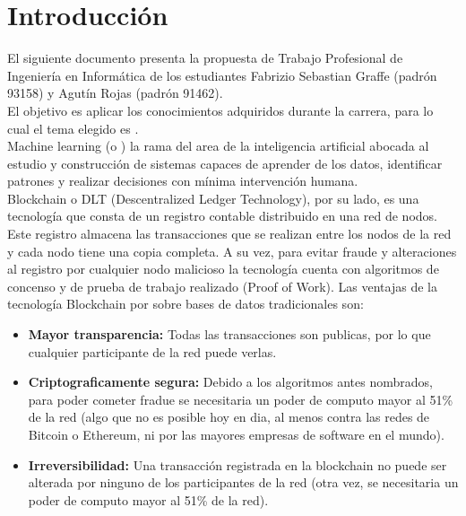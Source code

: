 \documentclass[
11pt, %
spanish, %
singlespacing, %
headsepline, %
]{MastersDoctoralThesis} %
\begin{document}

\tableofcontents %


\mainmatter %

\pagestyle{thesis} %

\chapter{Introducci\'on}
El siguiente documento presenta la propuesta de Trabajo Profesional de Ingeniería en Informática de los estudiantes Fabrizio Sebastian Graffe (padrón 93158) y Agutín Rojas (padrón 91462). \\

El objetivo es aplicar los conocimientos adquiridos durante la carrera, para lo cual el tema elegido es \textbf{ }. \\

Machine learning (o ) la rama del area de la inteligencia artificial abocada al estudio y construcción de sistemas capaces de aprender de los datos, identificar patrones y realizar decisiones con mínima intervención humana. \\

Blockchain o DLT (Descentralized Ledger Technology), por su lado, es una tecnología que consta de un registro contable distribuido en una red de nodos. Este registro almacena las transacciones que se realizan entre los nodos de la red y cada nodo tiene una copia completa. A su vez, para evitar fraude y alteraciones al registro por cualquier nodo malicioso la tecnología cuenta con algoritmos de concenso y de prueba de trabajo realizado (Proof of Work).
Las ventajas de la tecnología Blockchain por sobre bases de datos tradicionales son:
\begin{itemize}
\item \textbf{Mayor transparencia:} Todas las transacciones son publicas, por lo que cualquier participante de la red puede verlas.
\item \textbf{Criptograficamente segura:} Debido a los algoritmos antes nombrados, para poder cometer fradue se necesitaria un poder de computo mayor al 51\% de la red (algo que no es posible hoy en dia, al menos contra las redes de Bitcoin o Ethereum, ni por las mayores empresas de software en el mundo).
\item \textbf{Irreversibilidad:} Una transacción registrada en la blockchain no puede ser alterada por ninguno de los participantes de la red (otra vez, se necesitaria un poder de computo mayor al 51\% de la red).
\end{itemize}
\end{document}
